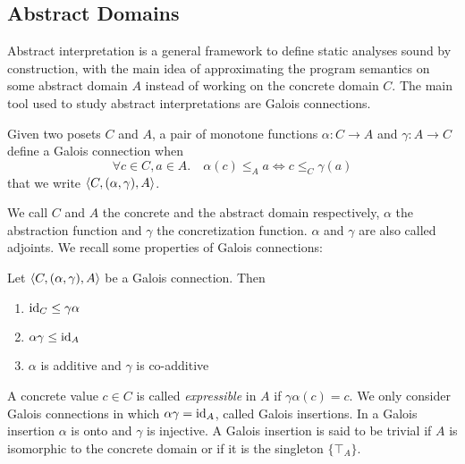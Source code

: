 \subsection{Abstract Domains}
Abstract interpretation \cite{CC77,CC79} is a general framework to define static analyses sound by construction, with the main idea of approximating the program semantics on some abstract domain $A$ instead of working on the concrete domain $C$. The main tool used to study abstract interpretations are Galois connections.
\begin{definition}
	Given two posets $C$ and $A$, a pair of monotone functions $\alpha : C \rightarrow A$ and $\gamma : A \rightarrow C$ define a Galois connection when 
	\[
	\forall c \in C, a \in A.\quad \alpha(c) \le_A a \iff c \le_C \gamma(a)
	\]
	that we write $\langle C, (\alpha, \gamma), A \rangle$.
\end{definition}
We call $C$ and $A$ the concrete and the abstract domain respectively, $\alpha$ the abstraction function and $\gamma$ the concretization function. $\alpha$ and $\gamma$ are also called adjoints.
We recall some properties of Galois connections:
\begin{prop}
	Let $\langle C, (\alpha, \gamma), A \rangle$ be a Galois connection. Then
	\begin{enumerate}
		\item $\text{id}_C \le \gamma \alpha$
		\item $\alpha \gamma \le \text{id}_A$
		\item $\alpha$ is additive and $\gamma$ is co-additive
	\end{enumerate}
\end{prop}
A concrete value $c \in C$ is called \emph{expressible} in $A$ if $\gamma \alpha(c) = c$.
We only consider Galois connections in which $\alpha \gamma = \text{id}_A$, called Galois insertions. In a Galois insertion $\alpha$ is onto and $\gamma$ is injective.
A Galois insertion is said to be trivial if $A$ is isomorphic to the concrete domain or if it is the singleton $\{ \top_A \}$.

